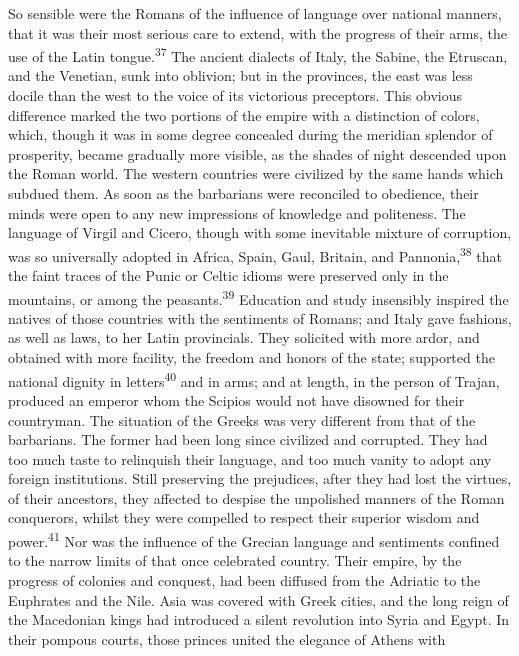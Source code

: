 So sensible were the Romans of the influence of language over
national manners, that it was their most serious care to extend,
with the progress of their arms, the use of the Latin tongue.\textsuperscript{37}
The ancient dialects of Italy, the Sabine, the Etruscan, and the
Venetian, sunk into oblivion; but in the provinces, the east was
less docile than the west to the voice of its victorious
preceptors. This obvious difference marked the two portions of
the empire with a distinction of colors, which, though it was in
some degree concealed during the meridian splendor of prosperity,
became gradually more visible, as the shades of night descended
upon the Roman world. The western countries were civilized by the
same hands which subdued them. As soon as the barbarians were
reconciled to obedience, their minds were open to any new
impressions of knowledge and politeness. The language of Virgil
and Cicero, though with some inevitable mixture of corruption,
was so universally adopted in Africa, Spain, Gaul, Britain, and
Pannonia,\textsuperscript{38} that the faint traces of the Punic or Celtic idioms
were preserved only in the mountains, or among the peasants.\textsuperscript{39}
Education and study insensibly inspired the natives of those
countries with the sentiments of Romans; and Italy gave fashions,
as well as laws, to her Latin provincials. They solicited with
more ardor, and obtained with more facility, the freedom and
honors of the state; supported the national dignity in letters\textsuperscript{40}
and in arms; and at length, in the person of Trajan, produced an
emperor whom the Scipios would not have disowned for their
countryman. The situation of the Greeks was very different from
that of the barbarians. The former had been long since civilized
and corrupted. They had too much taste to relinquish their
language, and too much vanity to adopt any foreign institutions.
Still preserving the prejudices, after they had lost the virtues,
of their ancestors, they affected to despise the unpolished
manners of the Roman conquerors, whilst they were compelled to
respect their superior wisdom and power.\textsuperscript{41} Nor was the influence
of the Grecian language and sentiments confined to the narrow
limits of that once celebrated country. Their empire, by the
progress of colonies and conquest, had been diffused from the
Adriatic to the Euphrates and the Nile. Asia was covered with
Greek cities, and the long reign of the Macedonian kings had
introduced a silent revolution into Syria and Egypt. In their
pompous courts, those princes united the elegance of Athens with
